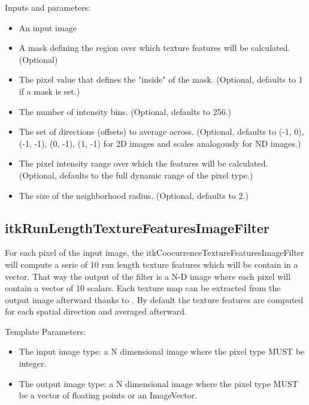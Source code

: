 \documentclass{InsightArticle}
\begin{document}
Inputs and parameters:
\begin{itemize}
 \item An input image
 \item A mask defining the region over which texture features will be calculated. (Optional)
 \item The pixel value that defines the "inside" of the mask. (Optional, defaults to 1 if a mask is set.)
 \item The number of intensity bins. (Optional, defaults to 256.)
 \item The set of directions (offsets) to average across. (Optional, defaults to {(-1, 0), (-1, -1), (0, -1), (1, -1)} for 2D images and scales analogously for ND images.)
 \item The pixel intensity range over which the features will be calculated. (Optional, defaults to the full dynamic range of the pixel type.)
 \item The size of the neighborhood radius. (Optional, defaults to 2.)
\end{itemize}

\subsection{itkRunLengthTextureFeaturesImageFilter}
\label{sec:RLFilter}

For each pixel of the input image, the itkCoocurrenceTextureFeaturesImageFilter will compute a serie of 10 run length texture features which will be contain in a vector. That way the output of the filter is a N-D image where each pixel will contain a vector of 10 scalars. Each texture map can be extracted from the output image afterward thanks to . By default the texture features are computed for each spatial direction and averaged afterward.

Template Parameters:
\begin{itemize}
 \item The input image type: a N dimensional image where the pixel type MUST be integer.
 \item The output image type: a N dimensional image where the pixel type MUST be a vector of floating points or an ImageVector.
\end{itemize}
\end{document}
